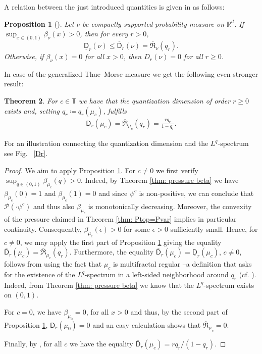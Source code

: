 \documentclass[11pt,reqno]{amsart}
\theoremstyle{plain}
\newtheorem{theorem}{Theorem}[section]
\newtheorem{prop}[theorem]{Proposition}
\theoremstyle{definition}
\newcommand{\R}{{\mathbb R}}
\newcommand{\T}{{\mathbb T}}
\begin{document}
A relation between the just introduced quantities is given in \cite{KessNieZhu} as follows:
\begin{prop}[{\cite[Thm.~1.1]{KessNieZhu}}]\label{prop: kessniezhu}
 Let $\nu$ be compactly supported probability measure
on $\R^{d}$. If $\sup_{x\in(0,1)}\beta_{\nu}(x)>0$, then for every
$r>0$, 
\[
\underline{\mathsf{D}}_{r}\left(\nu\right)\leq\overline{\mathsf{D}}_{r}\left(\nu\right)=\overline{\mathfrak{R}}_{\nu}\left(q_{r}\right).
\]
Otherwise, if $\beta_{\nu}(x)=0$ for all $x>0$, then $D_{r}\left(\nu\right)=0$
for all $r\geq0$.
\end{prop}

In case of the generalized Thue--Morse measure we get the following even stronger result:




\begin{theorem}
 For   $c\in\T$     we have that the quantization dimension of order $r\geqslant 0$ exists and, setting $q_{r}\coloneqq q_{r}(\mu_{c})$,  fulfills
 \begin{align*}
 \mathsf{D}_r(\mu_{c})=\overline{\mathfrak{R}}_{\mu_{c}}(q_r)=\frac{rq_r}{1-q_r}.
 \end{align*}
\end{theorem}
For an illustration  connecting  the quantization dimension and the $L^{q}$-spectrum see Fig.~ \ref{Dr}. 

\begin{proof}
We aim to apply Proposition \ref{prop: kessniezhu}. For $c\neq 0$ we first verify $\sup_{q\in (0,1)}\beta_{\mu_c}(q)>0$. 
Indeed, by Theorem \ref{thm: pressure beta}  we have $\beta_{\mu_c}(0)=1$ and $\beta_{\mu_c}(1)=0$ and since $\psi^c$ is non-positive, we can conclude that $\mathcal{P}(\cdot \psi^c)$ 
and thus also $\beta_{\mu_c}$ is monotonically decreasing. 
Moreover, the convexity of the pressure claimed in Theorem \ref{thm: Ptop=Pvar} implies  in particular continuity. Consequently,  $\beta_{\mu_c}(\epsilon)>0$ for some $\epsilon>0$ sufficiently small. 
Hence, for $c\neq 0$, we may apply the first part of Proposition \ref{prop: kessniezhu} giving the equality $\overline{\mathsf{D}}_r(\mu_{c})=\overline{\mathfrak{R}}_{\mu_{c}}(q_r)$. 
Furthermore, the equality $\overline{\mathsf{D}}_r(\mu_{c})=\underline{\mathsf{D}}_r(\mu_{c})$, $c\neq 0$, follows from \cite[Thm.~1.11]{KessNieZhu} using the fact  that $\mu_c$ is multifractal regular  --a definition that asks for the existence of the $L^q$-spectrum in a left-sided neighborhood  around $q_r$ (cf. \cite[Def.~1.10(2a)]{KessNieZhu}). Indeed, from Theorem \ref{thm: pressure beta} we know that the  $L^q$-spectrum exists on $(0,1)$.

For $c=0$, we have $\beta_{\mu_0}=0$, for all $x>0$ and thus, by the second part of Proposition \ref{prop: kessniezhu}, $\mathsf{D}_r(\mu_{0})=0$ and an easy calculation shows that $\overline{\mathfrak{R}}_{\mu_{c}}=0$.

Finally, by \cite[Rem.~1.3 (1)]{KessNieZhu}, for all $c$ we have the equality $\overline{\mathsf{D}}_r(\mu_{c})=rq_r/(1-q_r)$.
\end{proof}
\end{document}
